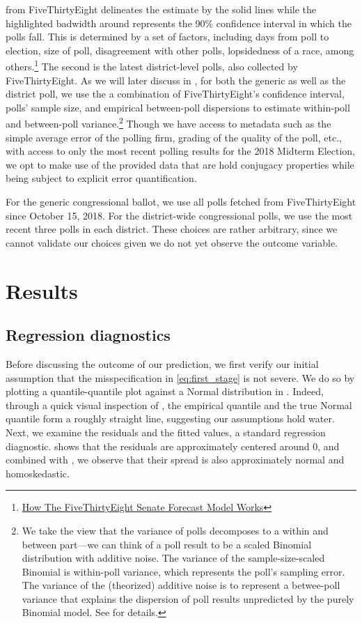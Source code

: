 \documentclass[12pt, letterpaper]{article}
\begin{document}
 from FiveThirtyEight delineates the estimate by the solid lines while the highlighted badwidth around represents the 90\% confidence interval in which the polls fall. This is determined by a set of factors, including days from poll to election, size of poll, disagreement with other polls, lopsidedness of a race, among others.\footnote{\href{https://fivethirtyeight.com/features/how-the-fivethirtyeight-senate-forecast-model-works/}{How The FiveThirtyEight Senate Forecast Model Works}} The second is the latest district-level polls, also collected by FiveThirtyEight. As we will later discuss in , for both the generic as well as the district poll, we use the a combination of FiveThirtyEight's confidence interval, polls' sample size, and empirical between-poll dispersions to estimate within-poll and between-poll variance.\footnote{We take the view that the variance of polls decomposes to a within and between part---we can think of a poll result to be a scaled Binomial distribution with additive noise. The variance of the sample-size-scaled Binomial is within-poll variance, which represents the poll's sampling error. The variance of the (theorized) additive noise is to represent a betwee-poll variance that explains the dispersion of poll results unpredicted by the purely Binomial model. See  for details.} Though we have access to metadata such as the simple average error of the polling firm, grading of the quality of the poll, etc., with access to only the most recent polling results for the 2018 Midterm Election, we opt to make use of the provided data that are hold conjugacy properties while being subject to explicit error quantification.

For the generic congressional ballot, we use all polls fetched from FiveThirtyEight since October 15, 2018. For the district-wide congressional polls, we use the most recent three polls in each district. These choices are rather arbitrary, since we cannot validate our choices given we do not yet observe the outcome variable.


\section{Results}
\label{sec:results}
\subsection{Regression diagnostics}
Before discussing the outcome of our prediction, we first verify our initial assumption that the misspecification in \eqref{eq:first_stage} is not severe. We do so by plotting a quantile-quantile plot against a Normal distribution in . Indeed, through a quick visual inspection of , the empirical quantile and the true Normal quantile form a roughly straight line, suggesting our assumptions hold water. Next, we examine the residuals and the fitted values, a standard regression diagnostic.  shows that the residuals are approximately centered around 0, and combined with , we observe that their spread is also approximately normal and homoskedastic.
\end{document}
